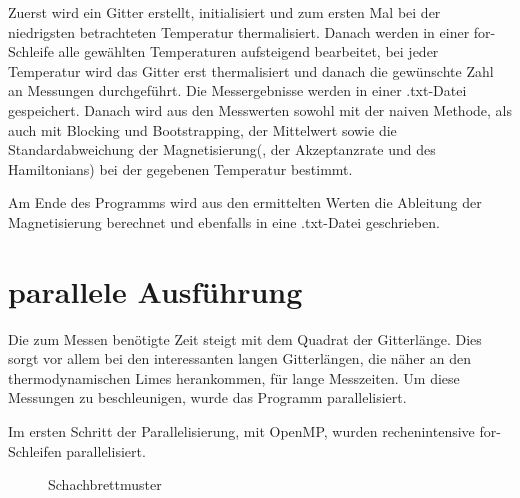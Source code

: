 	Zuerst wird ein Gitter erstellt, initialisiert und zum ersten Mal bei der niedrigsten betrachteten Temperatur thermalisiert. Danach werden in einer for-Schleife alle gewählten Temperaturen aufsteigend bearbeitet, bei jeder Temperatur wird das Gitter erst thermalisiert und danach die gewünschte Zahl an Messungen durchgeführt.
	Die Messergebnisse werden in einer .txt-Datei gespeichert. Danach wird aus den Messwerten sowohl mit der naiven Methode, als auch mit Blocking und Bootstrapping, der Mittelwert sowie die Standardabweichung der Magnetisierung(, der Akzeptanzrate und des Hamiltonians) bei der gegebenen Temperatur bestimmt.
	
	Am Ende des Programms wird aus den ermittelten Werten die Ableitung der Magnetisierung berechnet und ebenfalls in eine .txt-Datei geschrieben.
		
	
	\section{parallele Ausführung}
	\label{sec:parallelimplementierung}


	
	Die zum Messen benötigte Zeit steigt mit dem Quadrat der Gitterlänge. Dies sorgt vor allem bei den interessanten langen Gitterlängen, die näher an den thermodynamischen Limes herankommen, für lange Messzeiten. Um diese Messungen zu beschleunigen, wurde das Programm parallelisiert.
	
	Im ersten Schritt der Parallelisierung, mit OpenMP, wurden rechenintensive for-Schleifen parallelisiert.
	
	
	\begin{wrapfigure}{r}{3.5in}
		\centering
		
		\caption{Schachbrettmuster}
		\label{fig:schachbrett}
	\end{wrapfigure}
	
